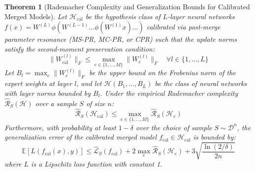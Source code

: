 \documentclass{article}
\theoremstyle{plain}
\newtheorem{theorem}{Theorem}[section]
\theoremstyle{definition}
\theoremstyle{remark}
\begin{document}
\begin{theorem}[Rademacher Complexity and Generalization Bounds for Calibrated Merged Models]
Let $\mathcal{H}_{\text{cal}}$ be the hypothesis class of $L$-layer neural networks $f(x) = W^{(L)} \phi( W^{(L-1)} \dots \phi(W^{(1)} x) \dots )$ calibrated via post-merge parameter resonance (MS-PR, MC-PR, or CPR) such that the update norms satisfy the second-moment preservation condition:
\begin{equation}
    \|W^{(l)}_{\text{cal}}\|_F \le \max_{e \in \{1, \dots, M\}} \|W_e^{(l)}\|_F \quad \forall l \in \{1, \dots, L\}
\end{equation}
Let $B_l = \max_{e} \|W_e^{(l)}\|_F$ be the upper bound on the Frobenius norm of the expert weights at layer $l$, and let $\mathcal{H}(B_1, \dots, B_L)$ be the class of neural networks with layer norms bounded by $B_l$. Under the empirical Rademacher complexity $\widehat{\mathcal{R}}_S(\mathcal{H})$ over a sample $S$ of size $n$:
\begin{equation}
    \widehat{\mathcal{R}}_S(\mathcal{H}_{\text{cal}}) \le \max_{e \in \{1, \dots, M\}} \widehat{\mathcal{R}}_S(\mathcal{H}_e)
\end{equation}
Furthermore, with probability at least $1-\delta$ over the choice of sample $S \sim \mathcal{D}^n$, the generalization error of the calibrated merged model $f_{\text{cal}} \in \mathcal{H}_{\text{cal}}$ is bounded by:
\begin{equation}
    \mathbb{E}[L(f_{\text{cal}}(x), y)] \le \widehat{\mathcal{L}}_S(f_{\text{cal}}) + 2 \max_{e} \widehat{\mathcal{R}}_S(\mathcal{H}_e) + 3 \sqrt{\frac{\ln(2/\delta)}{2n}}
\end{equation}
where $L$ is a Lipschitz loss function with constant 1.
\end{theorem}
\end{document}
